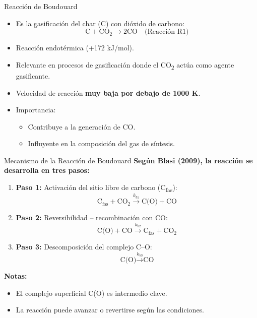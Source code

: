 \documentclass[../../main.tex]{subfiles}
\begin{document}
\begin{frame}{Reacción de Boudouard}
\small
\begin{itemize}
  \item Es la gasificación del char (C) con dióxido de carbono:
  \[
  \text{C} + \text{CO}_2 \rightarrow 2\text{CO} \quad \text{(Reacción R1)}
  \]
  \item Reacción endotérmica (+172 kJ/mol).
  \item Relevante en procesos de gasificación donde el CO\textsubscript{2} actúa como agente gasificante.
  \item Velocidad de reacción \textbf{muy baja por debajo de 1000 K}.
  \item Importancia:
  \begin{itemize}
    \item Contribuye a la generación de CO.
    \item Influyente en la composición del gas de síntesis.
  \end{itemize}
\end{itemize}
\end{frame}

\begin{frame}{Mecanismo de la Reacción de Boudouard}
\small
\textbf{Según Blasi (2009), la reacción se desarrolla en tres pasos:}

\vspace{0.5em}
\begin{enumerate}
  \item \textbf{Paso 1:} Activación del sitio libre de carbono (C\textsubscript{fas}):
  \[
  \text{C}_{\text{fas}} + \text{CO}_2 \xrightarrow{k_{b1}} \text{C(O)} + \text{CO}
  \]
  \item \textbf{Paso 2:} Reversibilidad – recombinación con CO:
  \[
  \text{C(O)} + \text{CO} \xrightarrow{k_{b2}} \text{C}_{\text{fas}} + \text{CO}_2
  \]
  \item \textbf{Paso 3:} Descomposición del complejo C–O:
  \[
  \text{C(O)} \xrightarrow{k_{b3}} \text{CO}
  \]
\end{enumerate}

\vspace{0.5em}
\textbf{Notas:}
\begin{itemize}
  \item El complejo superficial C(O) es intermedio clave.
  \item La reacción puede avanzar o revertirse según las condiciones.
\end{itemize}
\end{frame}
\end{document}
